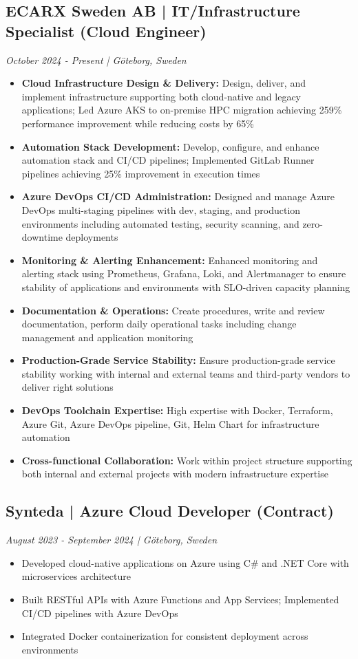 \documentclass[11pt,a4paper]{article}
\begin{document}
\subsection*{ECARX Sweden AB | IT/Infrastructure Specialist (Cloud Engineer)}
\textit{October 2024 - Present | Göteborg, Sweden}
\begin{itemize}[noitemsep]
\item \textbf{Cloud Infrastructure Design \& Delivery:} Design, deliver, and implement infrastructure supporting both cloud-native and legacy applications; Led Azure AKS to on-premise HPC migration achieving 259\% performance improvement while reducing costs by 65\%
\item \textbf{Automation Stack Development:} Develop, configure, and enhance automation stack and CI/CD pipelines; Implemented GitLab Runner pipelines achieving 25\% improvement in execution times
\item \textbf{Azure DevOps CI/CD Administration:} Designed and manage Azure DevOps multi-staging pipelines with dev, staging, and production environments including automated testing, security scanning, and zero-downtime deployments
\item \textbf{Monitoring \& Alerting Enhancement:} Enhanced monitoring and alerting stack using Prometheus, Grafana, Loki, and Alertmanager to ensure stability of applications and environments with SLO-driven capacity planning
\item \textbf{Documentation \& Operations:} Create procedures, write and review documentation, perform daily operational tasks including change management and application monitoring
\item \textbf{Production-Grade Service Stability:} Ensure production-grade service stability working with internal and external teams and third-party vendors to deliver right solutions
\item \textbf{DevOps Toolchain Expertise:} High expertise with Docker, Terraform, Azure Git, Azure DevOps pipeline, Git, Helm Chart for infrastructure automation
\item \textbf{Cross-functional Collaboration:} Work within project structure supporting both internal and external projects with modern infrastructure expertise
\end{itemize}

\subsection*{Synteda | Azure Cloud Developer (Contract)}
\textit{August 2023 - September 2024 | Göteborg, Sweden}
\begin{itemize}[noitemsep]
\item Developed cloud-native applications on Azure using C\# and .NET Core with microservices architecture
\item Built RESTful APIs with Azure Functions and App Services; Implemented CI/CD pipelines with Azure DevOps
\item Integrated Docker containerization for consistent deployment across environments
\end{itemize}
\end{document}
